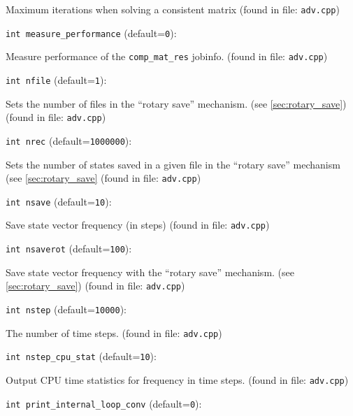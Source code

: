 Maximum iterations when solving a consistent matrix
 (found in file: \verb+adv.cpp+)
\item\verb+int measure_performance+ {\rm(default=\verb|0|)}:

Measure performance of the  \verb+comp_mat_res+  jobinfo. 
 (found in file: \verb+adv.cpp+)
\item\verb+int nfile+ {\rm(default=\verb|1|)}:

Sets the number of files in the ``rotary save'' mechanism. 
(see \ref{sec:rotary_save})
 (found in file: \verb+adv.cpp+)
\item\verb+int nrec+ {\rm(default=\verb|1000000|)}:

Sets the number of states saved in a given file
in the ``rotary save'' mechanism (see \ref{sec:rotary_save}
 (found in file: \verb+adv.cpp+)
\item\verb+int nsave+ {\rm(default=\verb|10|)}:

Save state vector frequency (in steps)
 (found in file: \verb+adv.cpp+)
\item\verb+int nsaverot+ {\rm(default=\verb|100|)}:

Save state vector frequency with the ``rotary save''
mechanism. (see \ref{sec:rotary_save})
 (found in file: \verb+adv.cpp+)
\item\verb+int nstep+ {\rm(default=\verb|10000|)}:

The number of time steps. 
 (found in file: \verb+adv.cpp+)
\item\verb+int nstep_cpu_stat+ {\rm(default=\verb|10|)}:

Output CPU time statistics for frequency in time steps. 
 (found in file: \verb+adv.cpp+)
\item\verb+int print_internal_loop_conv+ {\rm(default=\verb|0|)}:

